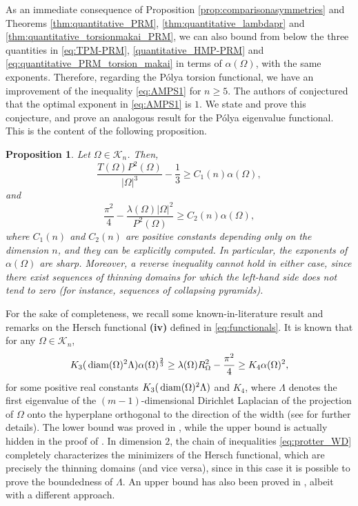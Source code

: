 \documentclass[oneside,a4paper,11pt,notitlepage]{article}
\newcommand{\abs}[1]{{\left|#1\right|}}
\theoremstyle{definition}
\theoremstyle{plain}
\newtheorem{prop}[teorema]{Proposition}
\theoremstyle{definition}
\DeclareMathOperator{\diam}{\, \textup{diam}}
\begin{document}
\noindent As an immediate consequence of Proposition \ref{prop:comparisonasymmetries} and Theorems \ref{thm:quantitative_PRM}, \ref{thm:quantitative_lambdapr} and \ref{thm:quantitative_torsionmakai_PRM}, we can also bound from below the three quantities in \eqref{eq:TPM-PRM}, \eqref{quantitative_HMP-PRM} and \eqref{eq:quantitative_PRM_torsion_makai} in terms of $\alpha(\Omega)$, with the same exponents. Therefore, regarding the P\'olya torsion functional, we have an improvement of the inequality \eqref{eq:AMPS1} for $n\ge 5$. The authors of \cite{AMPS} conjectured that the optimal exponent in \eqref{eq:AMPS1} is $1$. We state and prove this conjecture, and prove an analogous result for the P\'olya eigenvalue functional. This is the content of the following proposition.
\begin{prop} \label{prop:quantitative_wd}
Let $\Omega\in \mathcal{K}_n$. Then, 
\begin{equation}\label{quantitative_width}
 \frac{T(\Omega) P^2(\Omega)}{\abs{\Omega}^3}-\frac{1}{3}  \ge C_1(n) \alpha(\Omega),
\end{equation}
and 
\begin{equation}\label{quantitative_width2}
 \frac{\pi^2}{4} - \frac{\lambda( \Omega) \abs{\Omega}^2}{P^2(\Omega)}
 \ge C_2(n) \alpha(\Omega),
\end{equation}
where $C_1(n)$ and $C_2(n)$ are positive constants depending only on the dimension $n$, and they can be explicitly computed.  
In particular, the exponents of $\alpha(\Omega)$ are sharp. Moreover, a reverse inequality cannot hold in either case, since there exist sequences of thinning domains for which the left-hand side does not tend to zero (for instance, sequences of collapsing pyramids).

\end{prop}  

For the sake of completeness, we recall some known-in-literature result and remarks on the Hersch functional \textbf{(iv)} defined in \eqref{eq:functionals}. It is known that for any  $\Omega\in \mathcal{K}_n$,
\begin{equation}\label{eq:protter_WD}
    K_3(\diam(\Omega)^2\Lambda)\alpha(\Omega)^\frac{2}{3}\ge \lambda( \Omega)R^2_\Omega-\frac{\pi^2}{4}\ge K_4\alpha(\Omega)^2,
\end{equation}
for some positive real constants $K_3(\diam (\Omega)^2\Lambda)$ and $K_4$, where $\Lambda$ denotes the first eigenvalue of the $(m-1)$-dimensional Dirichlet Laplacian of the projection of $\Omega$ onto the hyperplane orthogonal to the direction of the width (see \cite{VFNT2016} for further details).
 The lower bound was proved in \cite{protter1981lower}, while the upper bound is actually hidden in the proof of \cite[Theorem $1.5$]{VFNT2016}. In dimension $2$, the chain of inequalities \eqref{eq:protter_WD} completely characterizes the minimizers of the Hersch functional, which are precisely the thinning domains (and vice versa), since in this case it is possible to prove the boundedness of $\Lambda$.
 An upper bound has also been proved in \cite{FT2021}, albeit with a different approach.
\end{document}
